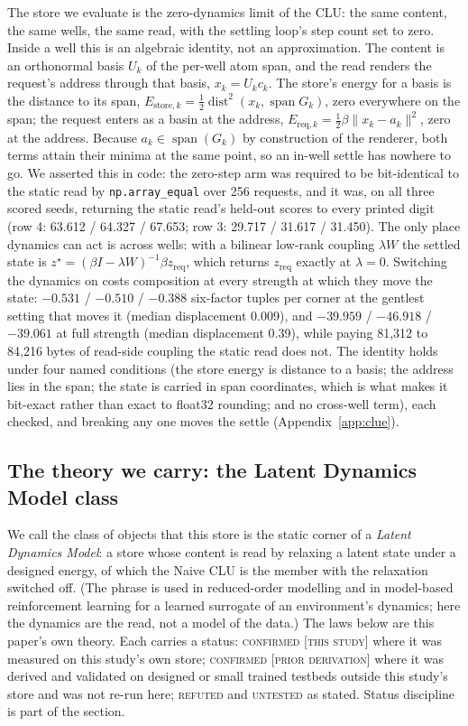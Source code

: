 \documentclass{article} %
\begin{document}
The store we evaluate is the zero-dynamics limit of the CLU: the same content, the same wells,
the same read, with the settling loop's step count set to zero. Inside a well this is an
algebraic identity, not an approximation. The content is an orthonormal basis $U_k$ of the
per-well atom span, and the read renders the request's address through that basis,
$x_k=U_k c_k$. The store's energy for a basis is the distance to its span,
$E_{\text{store},k}=\tfrac12\operatorname{dist}^2(x_k,\operatorname{span}G_k)$, zero everywhere
on the span; the request enters as a basin at the address, $E_{\text{req},k}=\tfrac12\beta\lVert
x_k-a_k\rVert^2$, zero at the address. Because $a_k\in\operatorname{span}(G_k)$ by construction
of the renderer, both terms attain their minima at the same point, so an in-well settle has
nowhere to go. We asserted this in code: the zero-step arm was required to be bit-identical to
the static read by \texttt{np.array\_equal} over 256 requests, and it was, on all three scored
seeds, returning the static read's held-out scores to every printed digit (row 4: 63.612 /
64.327 / 67.653; row 3: 29.717 / 31.617 / 31.450). %
The only place dynamics can act is across wells: with a bilinear low-rank coupling $\lambda W$
the settled state is $z^\star=(\beta I-\lambda W)^{-1}\beta z_{\text{req}}$, which returns
$z_{\text{req}}$ exactly at $\lambda=0$. Switching the dynamics on costs composition at every
strength at which they move the state: $-0.531$ / $-0.510$ / $-0.388$ six-factor tuples per
corner at the gentlest setting that moves it (median displacement 0.009), and $-39.959$ /
$-46.918$ / $-39.061$ at full strength (median displacement 0.39), while paying 81,312 to 84,216
bytes of read-side coupling the static read does not. %
The identity holds under four named conditions (the store energy is distance to a basis; the
address lies in the span; the state is carried in span coordinates, which is what makes it
bit-exact rather than exact to float32 rounding; and no cross-well term), each checked, and
breaking any one moves the settle (Appendix~\ref{app:clue}).

\subsection{The theory we carry: the Latent Dynamics Model class}
\label{sec:theory}

We call the class of objects that this store is the static corner of a \emph{Latent Dynamics
Model}: a store whose content is read by relaxing a latent state under a designed energy, of
which the Naive CLU is the member with the relaxation switched off. (The phrase is used in
reduced-order modelling and in model-based reinforcement learning for a learned surrogate of an
environment's dynamics; here the dynamics are the read, not a model of the data.) The laws below
are this paper's own theory. Each carries a status: \textsc{confirmed [this study]} where it was
measured on this study's own store; \textsc{confirmed [prior derivation]} where it was derived and
validated on designed or small trained testbeds outside this study's store and was not re-run
here; \textsc{refuted} and \textsc{untested} as stated. Status discipline is part of the section.
\end{document}
